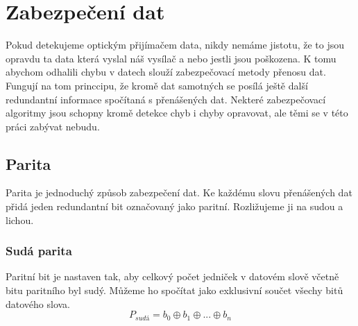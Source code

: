 \section{Zabezpečení dat}
Pokud detekujeme optickým přijímačem data, nikdy nemáme jistotu, že to jsou opravdu ta data která vyslal náš vysílač a nebo jestli jsou poškozena. K tomu abychom odhalili chybu v datech slouží zabezpečovací metody přenosu dat. Fungují na tom princcipu, že kromě dat samotných se posílá ještě další redundantní informace spočítaná s přenášených dat. Nekteré zabezpečovací algoritmy jsou schopny kromě detekce chyb i chyby opravovat, ale těmi se v této práci zabývat nebudu.

\subsection{Parita}
Parita je jednoduchý způsob zabezpečení dat. Ke každému slovu přenášených dat přidá jeden redundantní bit označovaný jako paritní. Rozližujeme ji na sudou a lichou.

\subsubsection{Sudá parita}
Paritní bit je nastaven tak, aby celkový počet jedniček v datovém slově včetně bitu paritního byl sudý. Můžeme ho spočítat jako exklusivní součet všechy bitů datového slova.
$$ P_{sudá} = b_0 \oplus b_1 \oplus ... \oplus b_n $$

